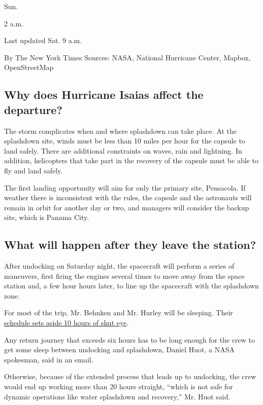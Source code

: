 Sun.

2 a.m.

Last updated Sat. 9 a.m.

By The New York Times \textbar{} Sources: NASA, National Hurricane
Center, Mapbox, OpenStreetMap

\hypertarget{why-does-hurricane-isaias-affect-the-departure}{%
\subsection{Why does Hurricane Isaias affect the
departure?}\label{why-does-hurricane-isaias-affect-the-departure}}

The storm complicates when and where splashdown can take place. At the
splashdown site, winds must be less than 10 miles per hour for the
capsule to land safely. There are additional constraints on waves, rain
and lightning. In addition, helicopters that take part in the recovery
of the capsule must be able to fly and land safely.

The first landing opportunity will aim for only the primary site,
Pensacola. If weather there is inconsistent with the rules, the capsule
and the astronauts will remain in orbit for another day or two, and
managers will consider the backup site, which is Panama City.

\hypertarget{what-will-happen-after-they-leave-the-station}{%
\subsection{What will happen after they leave the
station?}\label{what-will-happen-after-they-leave-the-station}}

After undocking on Saturday night, the spacecraft will perform a series
of maneuvers, first firing the engines several times to move away from
the space station and, a few hour hours later, to line up the spacecraft
with the splashdown zone.

For most of the trip, Mr. Behnken and Mr. Hurley will be sleeping. Their
\href{https://twitter.com/NASA/status/1289245570565992449}{schedule sets
aside 10 hours of shut eye}.

Any return journey that exceeds six hours has to be long enough for the
crew to get some sleep between undocking and splashdown, Daniel Huot, a
NASA spokesman, said in an email.

Otherwise, because of the extended process that leads up to undocking,
the crew would end up working more than 20 hours straight, ``which is
not safe for dynamic operations like water splashdown and recovery,''
Mr. Huot said.

